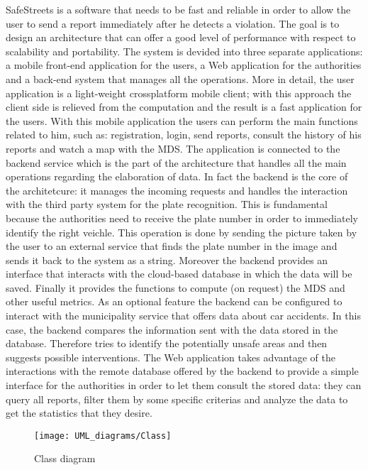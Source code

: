 SafeStreets is a software that needs to be fast and reliable in order to allow the user to send a report immediately after he detects a violation. The goal is to design an architecture that can offer a good level of performance with respect to scalability and portability. The system is devided into three separate applications: a mobile front-end application for the users, a Web application for the authorities and a back-end system that manages all the operations. More in detail, the user application is a light-weight crossplatform mobile client; with this approach the client side is relieved from the computation and the result is a fast application for the users. With this mobile application the users can perform the main functions related to him, such as: registration, login, send reports, consult the history of his reports and watch a map with the MDS. The application is connected to the backend service which is the part of the architecture that handles all the main operations regarding the elaboration of data. In fact the backend is the core of the architetcure: it manages the incoming requests and handles the interaction with the third party system for the plate recognition. This is fundamental because the authorities need to receive the plate number in order to immediately identify the right veichle. This operation is done by sending the picture taken by the user to an external service that finds the plate number in the image and sends it back to the system as a string. Moreover the backend provides an interface that interacts with the cloud-based database in which the data will be saved. Finally it provides the functions to compute (on request) the MDS and other useful metrics. As an optional feature the backend can be configured to interact with the municipality service that offers data about car accidents. In this case, the backend compares the information sent with the data stored in the database. Therefore tries to identify the potentially unsafe areas and then suggests possible interventions. The Web application takes advantage of the interactions with the remote database offered by the backend to provide a simple interface for the authorities in order to let them consult the stored data: they can query all reports, filter them by some specific criterias and analyze the data to get the statistics that they desire.
\begin{figure}[H]
    \centering
    \texttt{[image: UML\_diagrams/Class]}
    \caption{Class diagram}
    \label{fig:class_diagram}
\end{figure}